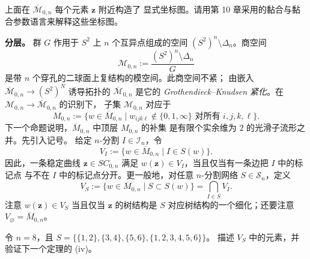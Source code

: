 \begin{exercise}\label{ex:D-4-5}
上面在 $\overline{\mathcal M}_{0,n}$ 每个元素 $\mathbf z$ 附近构造了
显式坐标图。请用第 10 章采用的黏合与黏合参数语言来解释这些坐标图。
\end{exercise}

\noindent\textbf{分层。}
群 $G$ 作用于 $S^2$ 上 $n$ 个互异点组成的空间
$(S^2)^n\setminus\Delta_n$。商空间
\begin{equation}\label{eq:D-4-10}
  \mathcal M_{0,n}:=\frac{(S^2)^n\setminus\Delta_n}{G}
\end{equation}
是带 $n$ 个穿孔的二球面上复结构的模空间。此商空间不紧；
由嵌入 $\overline{\mathcal M}_{0,n}\to(S^2)^N$ 诱导拓扑的
$\overline{\mathcal M}_{0,n}$ 是它的
\emph{Grothendieck--Knudsen 紧化}。在
$\mathcal M_{0,n}\to\overline{\mathcal M}_{0,n}$ 的识别下，
子集 $\mathcal M_{0,n}$ 对应于
\begin{equation}\label{eq:D-4-11}
  M_{0,n}:=\{w\in\overline M_{0,n}\mid
  w_{ijk\ell}\notin\{0,1,\infty\}
  \text{ 对所有 }i,j,k,\ell\}.
\end{equation}
下一个命题说明，$\overline M_{0,n}$ 中顶层 $M_{0,n}$ 的补集
是有限个实余维为 $2$ 的光滑子流形之并。先引入记号。
给定 $n$-分割 $I\in\mathcal I_n$，令
\begin{equation}\label{eq:D-4-12}
  V_I:=\{w\in\overline M_{0,n}\mid I\in S(w)\}.
\end{equation}
因此，一条稳定曲线 $\mathbf z\in SC_{0,n}$ 满足
$w(\mathbf z)\in V_I$，当且仅当有一条边把 $I$ 中的标记点
与不在 $I$ 中的标记点分开。更一般地，对任意 $n$-分割网络
$S\in\mathcal S_n$，定义
\begin{equation}\label{eq:D-4-13}
  V_S:=\{w\in\overline M_{0,n}\mid S\subset S(w)\}
  =\bigcap_{I\in S}V_I.
\end{equation}
注意 $w(\mathbf z)\in V_S$ 当且仅当 $\mathbf z$ 的树结构是
$S$ 对应树结构的一个细化；还要注意 $V_\varnothing=\overline M_{0,n}$。

\begin{exercise}\label{ex:D-4-6}
令 $n=8$，且
$S=\bigl\{\{1,2\},\{3,4\},\{5,6\},\{1,2,3,4,5,6\}\bigr\}$。
描述 $V_S$ 中的元素，并验证下一个定理的 (iv)。
\end{exercise}

